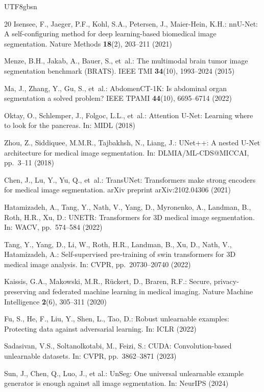\documentclass[a4paper,11pt]{article}
\begin{document}
\begin{CJK}{UTF8}{gbsn}
\begin{thebibliography}{20}
Isensee, F., Jaeger, P.F., Kohl, S.A., Petersen, J., Maier-Hein, K.H.:
nnU-Net: A self-configuring method for deep learning-based biomedical image segmentation.
Nature Methods \textbf{18}(2), 203--211 (2021)

Menze, B.H., Jakab, A., Bauer, S., et~al.:
The multimodal brain tumor image segmentation benchmark (BRATS).
IEEE TMI \textbf{34}(10), 1993--2024 (2015)

Ma, J., Zhang, Y., Gu, S., et~al.:
AbdomenCT-1K: Is abdominal organ segmentation a solved problem?
IEEE TPAMI \textbf{44}(10), 6695--6714 (2022)

Oktay, O., Schlemper, J., Folgoc, L.L., et~al.:
Attention U-Net: Learning where to look for the pancreas.
In: MIDL (2018)

Zhou, Z., Siddiquee, M.M.R., Tajbakhsh, N., Liang, J.:
UNet++: A nested U-Net architecture for medical image segmentation.
In: DLMIA/ML-CDS@MICCAI, pp.~3--11 (2018)

Chen, J., Lu, Y., Yu, Q., et~al.:
TransUNet: Transformers make strong encoders for medical image segmentation.
arXiv preprint arXiv:2102.04306 (2021)

Hatamizadeh, A., Tang, Y., Nath, V., Yang, D., Myronenko, A., Landman, B., Roth, H.R., Xu, D.:
UNETR: Transformers for 3D medical image segmentation.
In: WACV, pp.~574--584 (2022)

Tang, Y., Yang, D., Li, W., Roth, H.R., Landman, B., Xu, D., Nath, V., Hatamizadeh, A.:
Self-supervised pre-training of swin transformers for 3D medical image analysis.
In: CVPR, pp.~20730--20740 (2022)

Kaissis, G.A., Makowski, M.R., R\"{u}ckert, D., Braren, R.F.:
Secure, privacy-preserving and federated machine learning in medical imaging.
Nature Machine Intelligence \textbf{2}(6), 305--311 (2020)

Fu, S., He, F., Liu, Y., Shen, L., Tao, D.:
Robust unlearnable examples: Protecting data against adversarial learning.
In: ICLR (2022)

Sadasivan, V.S., Soltanolkotabi, M., Feizi, S.:
CUDA: Convolution-based unlearnable datasets.
In: CVPR, pp.~3862--3871 (2023)

Sun, J., Chen, Q., Luo, J., et al.:
UnSeg: One universal unlearnable example generator is enough against all image segmentation.
In: NeurIPS (2024)


\end{thebibliography}
\end{CJK}
\end{document}
